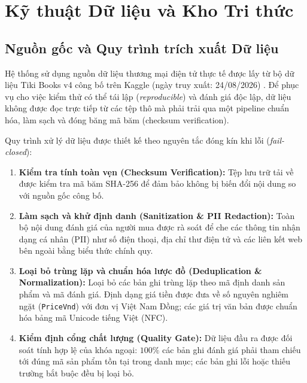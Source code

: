 \section{Kỹ thuật Dữ liệu và Kho Tri thức}

\subsection{Nguồn gốc và Quy trình trích xuất Dữ liệu}
Hệ thống sử dụng nguồn dữ liệu thương mại điện tử thực tế được lấy từ bộ dữ liệu Tiki Books v4 công bố trên Kaggle (ngày truy xuất: 24/08/2026) . Để phục vụ cho việc kiểm thử có thể tái lập (\textit{reproducible}) và đánh giá độc lập, dữ liệu không được đọc trực tiếp từ các tệp thô mà phải trải qua một pipeline chuẩn hóa, làm sạch và đóng băng mã băm (checksum verification).

Quy trình xử lý dữ liệu được thiết kế theo nguyên tắc đóng kín khi lỗi (\textit{fail-closed}):
\begin{enumerate}
    \item \textbf{Kiểm tra tính toàn vẹn (Checksum Verification):} Tệp lưu trữ tải về được kiểm tra mã băm SHA-256 để đảm bảo không bị biến đổi nội dung so với nguồn gốc công bố.
    \item \textbf{Làm sạch và khử định danh (Sanitization \& PII Redaction):} Toàn bộ nội dung đánh giá của người mua được rà soát để che các thông tin nhận dạng cá nhân (PII) như số điện thoại, địa chỉ thư điện tử và các liên kết web bên ngoài bằng biểu thức chính quy.
    \item \textbf{Loại bỏ trùng lặp và chuẩn hóa lược đồ (Deduplication \& Normalization):} Loại bỏ các bản ghi trùng lặp theo mã định danh sản phẩm và mã đánh giá. Định dạng giá tiền được đưa về số nguyên nghiêm ngặt (\texttt{PriceVnd}) với đơn vị Việt Nam Đồng; các giá trị văn bản được chuẩn hóa bảng mã Unicode tiếng Việt (NFC).
    \item \textbf{Kiểm định cổng chất lượng (Quality Gate):} Dữ liệu đầu ra được đối soát tính hợp lệ của khóa ngoại: $100\%$ các bản ghi đánh giá phải tham chiếu tới đúng mã sản phẩm tồn tại trong danh mục; các bản ghi lỗi hoặc thiếu trường bắt buộc đều bị loại bỏ.
\end{enumerate}

